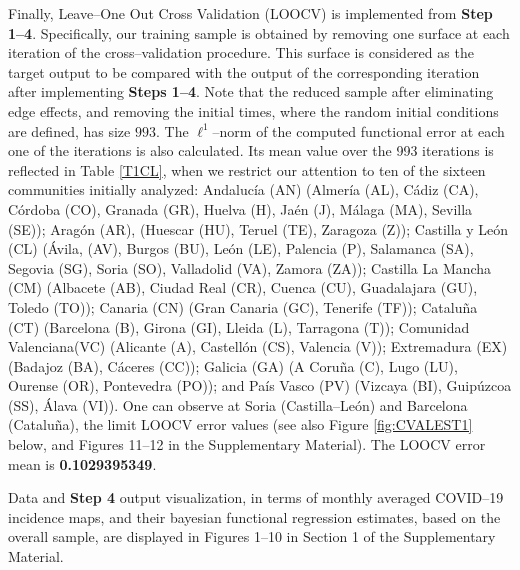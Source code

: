 \documentclass[11pt,a4paper]{article}
\begin{document}
 Finally,  Leave--One Out Cross Validation (LOOCV) is implemented from \textbf{Step 1--4}. Specifically, our training sample is obtained by removing one surface at each iteration of the cross--validation procedure. This surface is considered as the target output to be compared with the output of the corresponding  iteration after implementing \textbf{Steps 1--4}. Note that the reduced sample after eliminating edge effects, and removing the initial times, where the random initial conditions are defined, has size $993.$ The  $\ell^{1}$--norm of the computed   functional error at each one of the iterations is also calculated. Its mean value over the 993 iterations is reflected in  Table \ref{T1CL}, when we restrict our attention to  ten of the sixteen communities initially analyzed: Andaluc\'ia (AN) (Almer\'ia (AL), C\'adiz (CA), C\'ordoba (CO), Granada (GR), Huelva (H), Ja\'en (J), M\'alaga (MA), Sevilla (SE)); Arag\'on (AR), (Huescar (HU), Teruel (TE), Zaragoza (Z)); Castilla y Le\'on (CL) (\'Avila, (AV), Burgos (BU), Le\'on (LE), Palencia (P), Salamanca (SA), Segovia (SG), Soria (SO), Valladolid (VA), Zamora (ZA)); Castilla La Mancha (CM) (Albacete (AB), Ciudad Real (CR), Cuenca (CU), Guadalajara (GU), Toledo (TO)); Canaria (CN) (Gran Canaria (GC), Tenerife (TF));  Catalu\~na (CT) (Barcelona (B), Girona (GI), Lleida (L), Tarragona (T)); Comunidad Valenciana(VC) (Alicante (A), Castell\'on (CS), Valencia (V)); Extremadura (EX) (Badajoz (BA), C\'aceres (CC)); Galicia (GA) (A Coru\~na (C), Lugo (LU), Ourense (OR), Pontevedra (PO)); and  Pa\'is Vasco (PV) (Vizcaya (BI), Guip\'uzcoa (SS), \'Alava (VI)). One can observe  at Soria (Castilla--Le\'on)  and   Barcelona (Catalu\~na), the limit LOOCV error values  (see also Figure \ref{fig:CVALEST1} below, and  Figures 11--12 in the Supplementary Material). The   LOOCV error mean is \textbf{0.1029395349}.

 Data and \textbf{Step 4} output  visualization, in terms of  monthly averaged COVID--19 incidence maps, and their bayesian functional regression estimates, based on the overall sample,  are  displayed in Figures 1--10 in  Section 1 of the Supplementary Material.
\end{document}
